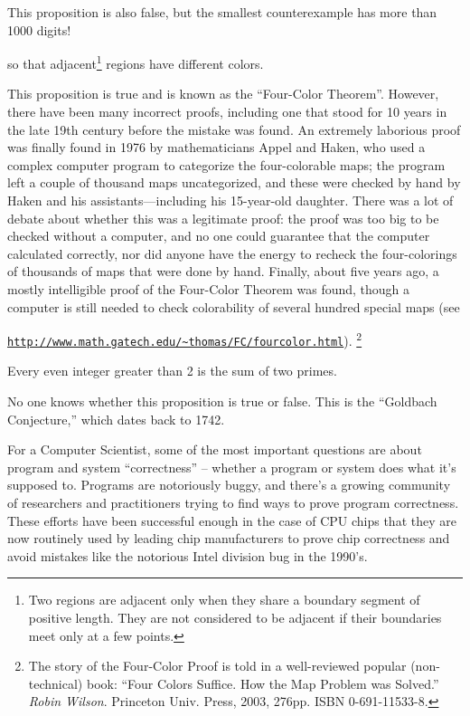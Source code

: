 This proposition is also false, but the smallest counterexample has
more than 1000 digits!

\begin{proposition}
 so that
adjacent\footnote{Two regions are adjacent only when they share a boundary
segment of positive length.  They are not considered to be adjacent if
their boundaries meet only at a few points.} regions have different
colors.
\end{proposition}

This proposition is true and is known as the ``Four-Color Theorem''.
However, there have been many incorrect proofs, including one that stood
for 10 years in the late 19th century before the mistake was found.  An
extremely laborious proof was finally found in 1976 by mathematicians
Appel and Haken, who used a complex computer program to categorize the
four-colorable maps; the program left a couple of thousand maps
uncategorized, and these were checked by hand by Haken and his
assistants---including his 15-year-old daughter.  There was a lot of
debate about whether this was a legitimate proof: the proof was too big to
be checked without a computer, and no one could guarantee that the
computer calculated correctly, nor did anyone have the energy to recheck
the four-colorings of thousands of maps that were done by hand.  Finally,
about five years ago, a mostly intelligible proof of the Four-Color
Theorem was found, though a computer is still needed to check colorability
of several hundred special maps (see

\href{http://www.math.gatech.edu/~thomas/FC/fourcolor.html}
{\texttt{http://www.math.gatech.edu/\~{}thomas/FC/fourcolor.html}}).
\footnote{The story of the Four-Color Proof is told in a well-reviewed
  popular (non-technical) book: ``Four Colors Suffice.  How the Map
  Problem was Solved.'' \emph{Robin Wilson}.  Princeton Univ. Press, 2003,
  276pp. ISBN 0-691-11533-8.}

\begin{proposition}[Goldbach]
Every even integer greater than 2 is the sum of two primes.
\end{proposition}

No one knows whether this proposition is true or false.  This is the
``Goldbach Conjecture,'' which dates back to 1742.

\iffalse

For a Computer Scientist, some of the most important questions are about
program and system ``correctness'' -- whether a program or system does what
it's supposed to.  Programs are notoriously buggy, and there's a growing
community of researchers and practitioners trying to find ways to prove
program correctness.  These efforts have been successful enough in the case
of CPU chips that they are now routinely used by leading chip manufacturers
to prove chip correctness and avoid mistakes like the notorious Intel
division bug in the 1990's.

